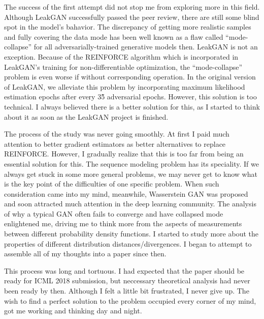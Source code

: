 \documentclass{article}
\begin{document}
      The success of the first attempt did not stop me from exploring more in this field. Although LeakGAN successfully passed the peer review, there are still some blind spot in the model's bahavior. The discrepancy of getting more realistic samples and fully covering the data mode has been well known as a flaw called ``mode-collapse'' for all adversarially-trained generative models then. LeakGAN is not an exception. Because of the REINFORCE algorithm which is incorporated in LeakGAN's training for non-differentiable optimization, the ``mode-collapse'' problem is even worse if without corresponding operation. In the original version of LeakGAN, we alleviate this problem by incorporating maximum likelihood estimation epochs after every 3\~5 adversarial epochs. However, this solution is too technical. I always believed there is a better solution for this, as I started to think about it as soon as the LeakGAN project is finished.

      The process of the study was never going smoothly. At first I paid much attention to better gradient estimators as better alternatives to replace REINFORCE. However, I gradually realize that this is too far from being an essential solution for this. The sequence modeling problem has its speciality. If we always get stuck in some more general problems, we may never get to know what is the key point of the difficulties of one specific problem. When such consideration came into my mind, meanwhile, Wasserstein GAN was proposed and soon attracted much attention in the deep learning community. The analysis of why a typical GAN often fails to converge and have collapsed mode enlightened me, driving me to think more from the aspects of measurements between different probability density functions. I started to study more about the properties of different distribution distances/divergences. I began to attempt to assemble all of my thoughts into a paper since then.

      This process was long and tortuous. I had expected that the paper should be ready for ICML 2018 submission, but neccessary theoretical analysis had never been ready by then. Although I felt a little bit frustrated, I never give up. The wish to find a perfect solution to the problem occupied every corner of my mind, got me working and thinking day and night.
\end{document}
